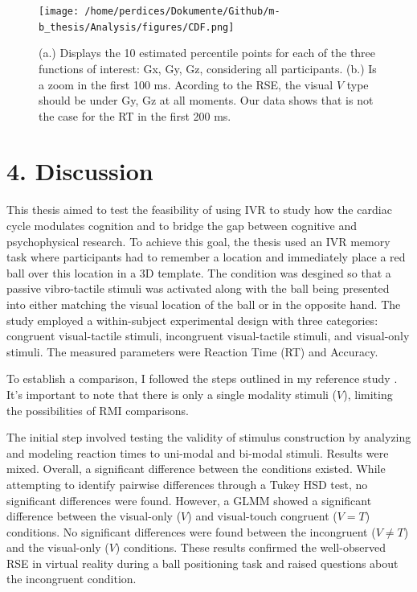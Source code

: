 \documentclass[12pt,oneside,openright]{report}
\begin{document}
\begin{figure}[!ht]
    \centering
    \texttt{[image: /home/perdices/Dokumente/Github/m-b\_thesis/Analysis/figures/CDF.png]}
    \caption{ (a.) Displays the 10 estimated percentile points for each of the three functions of interest: Gx, Gy, Gz, considering all participants. (b.) Is a zoom in the first 100 ms. Acording to the RSE, the visual $V$ type should be under Gy, Gz at all moments. Our data shows that is not the case for the RT in the first 200 ms.}
    \label{fig:CDF}
\end{figure}


\section*{4. Discussion}

This thesis aimed to test the feasibility of using IVR to study how the cardiac cycle modulates cognition and to bridge the gap between cognitive and psychophysical research. To achieve this goal, the thesis used an IVR memory task where participants had to remember a location and immediately place a red ball over this location in a 3D template. The condition was desgined so that  a passive vibro-tactile stimuli was activated along with the ball being presented into either matching the visual location of the ball or in the opposite hand. The study employed a within-subject experimental design with three categories: congruent visual-tactile stimuli, incongruent visual-tactile stimuli, and visual-only stimuli. The measured parameters were Reaction Time (RT) and Accuracy.

To establish a comparison, I followed the steps outlined in my reference study \parencite{Innes2019ACA, SALTAFOSSI2023108642, Ulrich2007}. It's important to note that there is only a single modality stimuli ($V$), limiting the possibilities of RMI comparisons.

The initial step involved testing the validity of stimulus construction by analyzing and modeling reaction times to uni-modal and bi-modal stimuli. Results were mixed. Overall, a significant difference between the conditions existed. While attempting to identify pairwise differences through a Tukey HSD test, no significant differences were found. However, a GLMM showed a significant difference between the visual-only ($V$) and visual-touch congruent ($V=T$) conditions. No significant differences were found between the incongruent ($V \neq T$) and the visual-only ($V$) conditions. These results confirmed the well-observed RSE in virtual reality during a ball positioning task and raised questions about the incongruent condition.
\end{document}
